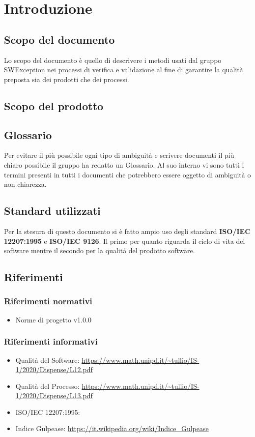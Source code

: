 \section{Introduzione}
\subsection{Scopo del documento}
Lo scopo del documento è quello di descrivere i metodi usati dal gruppo SWException nei processi di verifica e validazione al fine di garantire la qualità preposta sia dei prodotti che dei processi.
\subsection{Scopo del prodotto}

\subsection{Glossario}
Per evitare il più possibile ogni tipo di ambiguità e scrivere documenti il più chiaro possibile il gruppo ha redatto un Glossario. Al suo interno vi sono tutti i termini presenti in tutti i documenti che potrebbero essere oggetto di ambiguità o non chiarezza.
\subsection{Standard utilizzati}
Per la stesura di questo documento si è fatto ampio uso degli standard \textbf{ISO/IEC 12207:1995} e \textbf{ISO/IEC 9126}. Il primo per quanto riguarda il ciclo di vita del software mentre il secondo per la qualità del prodotto software.
\subsection{Riferimenti}
\subsubsection{Riferimenti normativi}
\begin{itemize}
    \item Norme di progetto v1.0.0
\end{itemize}
\subsubsection{Riferimenti informativi}
\begin{itemize}
    \item Qualità del Software: \url{https://www.math.unipd.it/~tullio/IS-1/2020/Dispense/L12.pdf}
    \item Qualità del Processo: \url{https://www.math.unipd.it/~tullio/IS-1/2020/Dispense/L13.pdf}
    \item ISO/IEC 12207:1995: 
    \item Indice Gulpease: \url{https://it.wikipedia.org/wiki/Indice_Gulpease}
\end{itemize}
